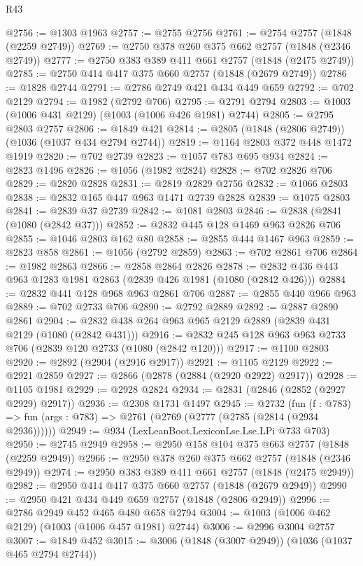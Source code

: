 \begin{lexlean}{R43}
\begin{coremodule}
@2756 := @1303 @1963
@2757 := @2755 @2756
@2761 := @2754 @2757 (@1848 (@2259 @2749))
@2769 := @2750 @378 @260 @375 @662 @2757 (@1848 (@2346 @2749))
@2777 := @2750 @383 @389 @411 @661 @2757 (@1848 (@2475 @2749))
@2785 := @2750 @414 @417 @375 @660 @2757 (@1848 (@2679 @2749))
@2786 := @1828 @2744
@2791 := @2786 @2749 @421 @434 @449 @659
@2792 := @702 @2129
@2794 := @1982 (@2792 @706)
@2795 := @2791 @2794
@2803 := @1003 (@1006 @431 @2129) (@1003 (@1006 @426 @1981) @2744)
@2805 := @2795 @2803 @2757
@2806 := @1849 @421
@2814 := @2805 (@1848 (@2806 @2749)) (@1036 (@1037 @434 @2794 @2744))
@2819 := @1164 @2803 @372 @448 @1472 @1919
@2820 := @702 @2739
@2823 := @1057 @783 @695 @934
@2824 := @2823 @1496
@2826 := @1056 (@1982 @2824)
@2828 := @702 @2826 @706
@2829 := @2820 @2828
@2831 := @2819 @2829 @2756
@2832 := @1066 @2803
@2838 := @2832 @165 @447 @963 @1471 @2739 @2828
@2839 := @1075 @2803
@2841 := @2839 @37 @2739
@2842 := @1081 @2803
@2846 := @2838 (@2841 (@1080 (@2842 @37)))
@2852 := @2832 @445 @128 @1469 @963 @2826 @706
@2855 := @1046 @2803 @162 @80
@2858 := @2855 @444 @1467 @963
@2859 := @2823 @858
@2861 := @1056 (@2792 @2859)
@2863 := @702 @2861 @706
@2864 := @1982 @2863
@2866 := @2858 @2864 @2826
@2878 := @2832 @436 @443 @963 @1283 @1981 @2863 (@2839 @426 @1981 (@1080 (@2842 @426)))
@2884 := @2832 @441 @128 @968 @963 @2861 @706
@2887 := @2855 @440 @966 @963
@2889 := @702 @2733 @706
@2890 := @2792 @2889
@2892 := @2887 @2890 @2861
@2904 := @2832 @438 @264 @963 @965 @2129 @2889 (@2839 @431 @2129 (@1080 (@2842 @431)))
@2916 := @2832 @245 @128 @963 @963 @2733 @706 (@2839 @120 @2733 (@1080 (@2842 @120)))
@2917 := @1100 @2803
@2920 := @2892 (@2904 (@2916 @2917))
@2921 := @1105 @2129
@2922 := @2921 @2859
@2927 := @2866 (@2878 (@2884 (@2920 @2922) @2917))
@2928 := @1105 @1981
@2929 := @2928 @2824
@2934 := @2831 (@2846 (@2852 (@2927 @2929) @2917))
@2936 := @2308 @1731 @1497
@2945 := @2732
    (fun (f : @783) => fun (args : @783) => @2761 (@2769 (@2777 (@2785 (@2814 (@2934 @2936))))))
@2949 := @934 (LexLeanBoot.LexiconLse.Lse.LPi @733 @703)
@2950 := @2745 @2949
@2958 := @2950 @158 @104 @375 @663 @2757 (@1848 (@2259 @2949))
@2966 := @2950 @378 @260 @375 @662 @2757 (@1848 (@2346 @2949))
@2974 := @2950 @383 @389 @411 @661 @2757 (@1848 (@2475 @2949))
@2982 := @2950 @414 @417 @375 @660 @2757 (@1848 (@2679 @2949))
@2990 := @2950 @421 @434 @449 @659 @2757 (@1848 (@2806 @2949))
@2996 := @2786 @2949 @452 @465 @480 @658 @2794
@3004 := @1003 (@1006 @462 @2129) (@1003 (@1006 @457 @1981) @2744)
@3006 := @2996 @3004 @2757
@3007 := @1849 @452
@3015 := @3006 (@1848 (@3007 @2949)) (@1036 (@1037 @465 @2794 @2744))

\end{coremodule}
\end{lexlean}

